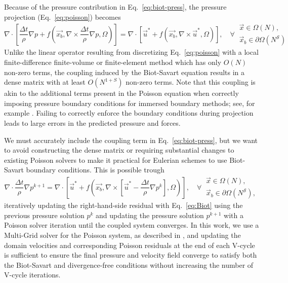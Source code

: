 \documentclass[final,1p,times]{elsarticle}
\begin{document}
Because of the pressure contribution in Eq.~\ref{eq:biot-press}, the pressure projection (Eq.~\ref{eq:poisson}) becomes
\begin{equation}\label{eq:complex_poisson}
    \nabla\cdot\left[\frac{\Delta t}{\rho}\nabla p + f\left(\vec{x_b},\nabla\times\frac{\Delta t}{\rho}\nabla p,\Omega\right)\right] = \nabla\cdot\left[ \vec{u}^* + f(\vec{x_b},\nabla\times\vec{u}^*,\Omega)\right], \quad\forall\
    \begin{array}{l}
    \vec{x} \in \Omega(N),\\
    \vec{x}_b \in \partial\Omega(N^\mathcal{S})
    \end{array}
\end{equation}
Unlike the linear operator resulting from discretizing Eq.~\ref{eq:poisson} with a local finite-difference finite-volume or finite-element method which has only $O(N)$ non-zero terms, the coupling induced by the Biot-Savart equation results in a dense matrix with at least $O(N^{1+S})$ non-zero terms. Note that this coupling is akin to the additional terms present in the Poisson equation when correctly imposing pressure boundary conditions for immersed boundary methods; see, for example \cite{Taira2007, Lauber2022}. Failing to correctly enforce the boundary conditions during projection leads to large errors in the predicted pressure and forces.

We must accurately include the coupling term in Eq.~\ref{eq:biot-press}, but we want to avoid constructing the dense matrix or requiring substantial changes to existing Poisson solvers to make it practical for Eulerian schemes to use Biot-Savart boundary conditions. This is possible trough
\begin{equation}\label{eq:differed_poisson}
    \nabla\cdot\frac{\Delta t}{\rho}\nabla p^{k+1} = \nabla\cdot\left[ \vec{u}^* + f\left(\vec{x_b},\nabla\times\left[\vec{u}^*-\frac{\Delta t}{\rho}\nabla p^k\right],\Omega\right)\right], \quad\forall\
    \begin{array}{l}
    \vec{x} \in \Omega(N),\\
    \vec{x}_b \in \partial\Omega(N^\mathcal{S}),
    \end{array}
\end{equation}
iteratively updating the right-hand-side residual with Eq.~\ref{eq:Biot} using the previous pressure solution $p^k$ and updating the pressure solution $p^{k+1}$ with a Poisson solver iteration until the coupled system converges. In this work, we use a Multi-Grid solver for the Poisson system, as described in \cite{Weymouth2022Data-drivenProjection}, and updating the domain velocities and corresponding Poisson residuals at the end of each V-cycle is sufficient to ensure the final pressure and velocity field converge to satisfy both the Biot-Savart and divergence-free conditions without increasing the number of V-cycle iterations. 
\end{document}
